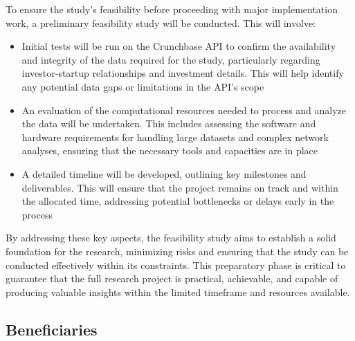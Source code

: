 \documentclass[a4paper,11pt]{article}
\begin{document}
To ensure the study's feasibility before proceeding with major implementation work, a preliminary feasibility study will be conducted. This will involve:
\begin{itemize}
    \item Initial tests will be run on the Crunchbase API to confirm the availability and integrity of the data required for the study, particularly regarding investor-startup relationships and investment details. This will help identify any potential data gaps or limitations in the API's scope
    \item An evaluation of the computational resources needed to process and analyze the data will be undertaken. This includes assessing the software and hardware requirements for handling large datasets and complex network analyses, ensuring that the necessary tools and capacities are in place
    \item A detailed timeline will be developed, outlining key milestones and deliverables. This will ensure that the project remains on track and within the allocated time, addressing potential bottlenecks or delays early in the process
\end{itemize}

By addressing these key aspects, the feasibility study aims to establish a solid foundation for the research, minimizing risks and ensuring that the study can be conducted effectively within its constraints. This preparatory phase is critical to guarantee that the full research project is practical, achievable, and capable of producing valuable insights within the limited timeframe and resources available.

\subsection{Beneficiaries}
\end{document}
